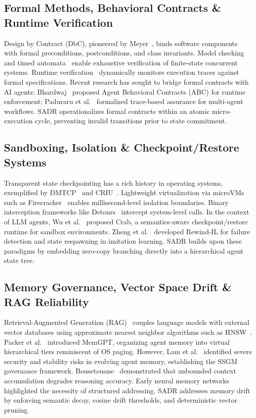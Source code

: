 \documentclass[10pt,journal,compsoc]{IEEEtran}
\begin{document}
\subsection{Formal Methods, Behavioral Contracts \& Runtime Verification}
Design by Contract (DbC), pioneered by Meyer~\cite{meyer1992design}, binds software components with formal preconditions, postconditions, and class invariants. Model checking~\cite{clarke1986model} and timed automata~\cite{alur1994theory} enable exhaustive verification of finite-state concurrent systems. Runtime verification~\cite{havelund2004runtime, leucker2009brief} dynamically monitors execution traces against formal specifications. Recent research has sought to bridge formal contracts with AI agents: Bhardwaj~\cite{bhardwaj2026abc} proposed Agent Behavioral Contracts (ABC) for runtime enforcement; Paduraru et al.~\cite{paduraru2026trace} formalized trace-based assurance for multi-agent workflows. SADR operationalizes formal contracts within an atomic micro-execution cycle, preventing invalid transitions prior to state commitment.

\subsection{Sandboxing, Isolation \& Checkpoint/Restore Systems}
Transparent state checkpointing has a rich history in operating systems, exemplified by DMTCP~\cite{ansel2009dmtcp} and CRIU~\cite{price2016criu}. Lightweight virtualization via microVMs such as Firecracker~\cite{agache2020firecracker} enables millisecond-level isolation boundaries. Binary interception frameworks like Detours~\cite{hunt1999detours} intercept system-level calls. In the context of LLM agents, Wu et al.~\cite{wu2026crab} proposed Crab, a semantics-aware checkpoint/restore runtime for sandbox environments. Zheng et al.~\cite{zheng2026rewind} developed Rewind-IL for failure detection and state respawning in imitation learning. SADR builds upon these paradigms by embedding zero-copy branching directly into a hierarchical agent state tree.

\subsection{Memory Governance, Vector Space Drift \& RAG Reliability}
Retrieval-Augmented Generation (RAG)~\cite{lewis2020rag, karpukhin2020dpr, gao2023rag_survey} couples language models with external vector databases using approximate nearest neighbor algorithms such as HNSW~\cite{malkov2020hnsw}. Packer et al.~\cite{packer2023memgpt} introduced MemGPT, organizing agent memory into virtual hierarchical tiers reminiscent of OS paging. However, Lam et al.~\cite{lam2026ssgm} identified severe security and stability risks in evolving agent memory, establishing the SSGM governance framework. Bousetouane~\cite{bousetouane2026acc} demonstrated that unbounded context accumulation degrades reasoning accuracy. Early neural memory networks~\cite{graves2014ntm, weston2015memorynetworks} highlighted the necessity of structured addressing. SADR addresses memory drift by enforcing semantic decay, cosine drift thresholds, and deterministic vector pruning.
\end{document}
